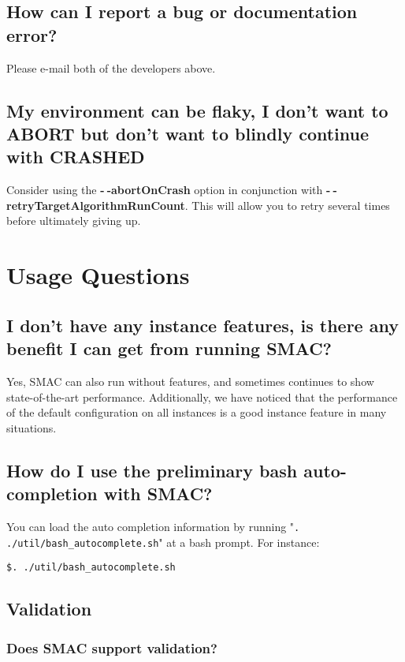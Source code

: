 \documentclass[11pt,letterpaper,oneside]{article}
\begin{document}
\subsection{How can I report a bug or documentation error?}
 Please e-mail both of the developers above.

\subsection{My environment can be flaky, I don't want to ABORT but don't want to blindly continue with CRASHED}

	Consider using the \textbf{-$~\!$-abortOnCrash} option in conjunction with \textbf{-$~\!$-retryTargetAlgorithmRunCount}. This will allow you to retry several times before ultimately giving up.


\section{Usage Questions}

\subsection{I don't have any instance features, is there any benefit I can get from running SMAC?}

	Yes, SMAC can also run without features, and sometimes continues to show state-of-the-art performance. Additionally, we have noticed that the performance of the default configuration on all instances is a good instance feature in many situations.

\subsection{How do I use the preliminary bash auto-completion with SMAC?}

	You can load the auto completion information by running "\texttt{. ./util/bash\_autocomplete.sh}" at a bash prompt. For instance:
\begin{verbatim}
$. ./util/bash_autocomplete.sh
\end{verbatim}

	
	


\subsection{Validation}

\subsubsection{Does SMAC support validation?}
\end{document}
